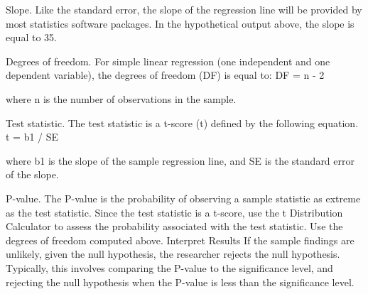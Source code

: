 \documentclass[a4paper,12pt]{article}
\begin{document}
Slope. Like the standard error, the slope of the regression line will be provided by most statistics software packages. In the hypothetical output above, the slope is equal to 35.

Degrees of freedom. For simple linear regression (one independent and one dependent variable), the degrees of freedom (DF) is equal to:
DF = n - 2

where n is the number of observations in the sample.

Test statistic. The test statistic is a t-score (t) defined by the following equation.
t = b1 / SE

where b1 is the slope of the sample regression line, and SE is the standard error of the slope.

P-value. The P-value is the probability of observing a sample statistic as extreme as the test statistic. Since the test statistic is a t-score, use the t Distribution Calculator to assess the probability associated with the test statistic. Use the degrees of freedom computed above.
Interpret Results
If the sample findings are unlikely, given the null hypothesis, the researcher rejects the null hypothesis. Typically, this involves comparing the P-value to the significance level, and rejecting the null hypothesis when the P-value is less than the significance level.
\end{document}
